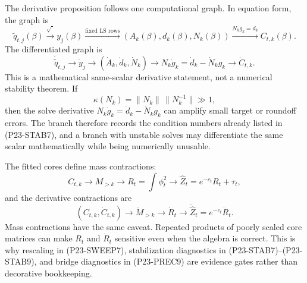 \documentclass[11pt]{article}
\begin{document}
The derivative proposition follows one computational graph.  In equation form,
the graph is
\[
    \widetilde q_{t,j}(\beta)
    \xrightarrow{\sqrt{\cdot}}
    y_j(\beta)
    \xrightarrow{\text{fixed LS rows}}
    (A_k(\beta),d_k(\beta),N_k(\beta))
    \xrightarrow{N_kg_k=d_k}
    C_{t,k}(\beta).
    \tag{P23-GDAG1}
\]
The differentiated graph is
\[
    \dot{\widetilde q}_{t,j}
    \to
    \dot y_j
    \to
    (\dot A_k,\dot d_k,\dot N_k)
    \to
    N_k\dot g_k=\dot d_k-\dot N_k g_k
    \to
    \dot C_{t,k}.
    \tag{P23-GDAG2}
\]
This is a mathematical same-scalar derivative statement, not a numerical
stability theorem.  If
\[
    \kappa(N_k)
    =
    \|N_k\|\,\|N_k^{-1}\|
    \gg 1,
    \tag{P23-GDAG2a}
\]
then the solve derivative
\(N_k\dot g_k=\dot d_k-\dot N_kg_k\) can amplify small target or roundoff
errors.  The branch therefore records the condition numbers already listed in
(P23-STAB7), and a branch with unstable solves may differentiate the same
scalar mathematically while being numerically unusable.

The fitted cores define mass contractions:
\[
    C_{t,k}
    \to
    M_{>k}
    \to
    R_t=\int\phi_t^2
    \to
    \widehat Z_t=e^{-c_t}R_t+\tau_t,
    \tag{P23-GDAG3}
\]
and the derivative contractions are
\[
    (C_{t,k},\dot C_{t,k})
    \to
    \dot M_{>k}
    \to
    \dot R_t
    \to
    \dot{\widehat Z}_t=e^{-c_t}\dot R_t.
    \tag{P23-GDAG4}
\]
Mass contractions have the same caveat.  Repeated products of poorly scaled
core matrices can make \(R_t\) and \(\dot R_t\) sensitive even when the algebra
is correct.  This is why rescaling in (P23-SWEEP7), stabilization diagnostics
in (P23-STAB7)--(P23-STAB9), and bridge diagnostics in (P23-PREC9) are
evidence gates rather than decorative bookkeeping.
\end{document}
